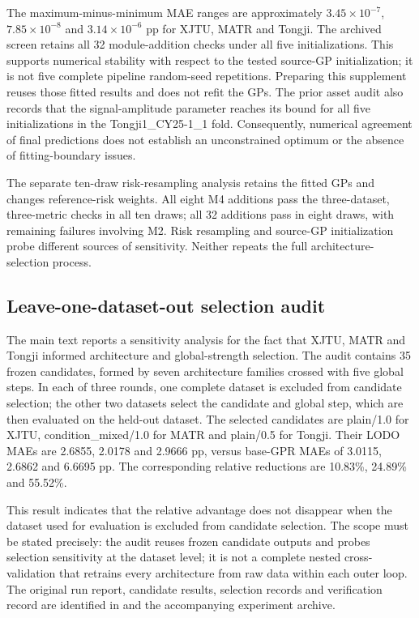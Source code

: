 \documentclass[11pt,a4paper]{article}
\begin{document}


The maximum-minus-minimum MAE ranges are approximately $3.45\times10^{-7}$, $7.85\times10^{-8}$ and $3.14\times10^{-6}$ pp for XJTU, MATR and Tongji. The archived screen retains all 32 module-addition checks under all five initializations. This supports numerical stability with respect to the tested source-GP initialization; it is not five complete pipeline random-seed repetitions. Preparing this supplement reuses those fitted results and does not refit the GPs. The prior asset audit also records that the signal-amplitude parameter reaches its bound for all five initializations in the Tongji1\_CY25-1\_1 fold. Consequently, numerical agreement of final predictions does not establish an unconstrained optimum or the absence of fitting-boundary issues.

The separate ten-draw risk-resampling analysis retains the fitted GPs and changes reference-risk weights. All eight M4 additions pass the three-dataset, three-metric checks in all ten draws; all 32 additions pass in eight draws, with remaining failures involving M2. Risk resampling and source-GP initialization probe different sources of sensitivity. Neither repeats the full architecture-selection process.

\subsection{Leave-one-dataset-out selection audit}
The main text reports a sensitivity analysis for the fact that XJTU, MATR and Tongji informed architecture and global-strength selection. The audit contains 35 frozen candidates, formed by seven architecture families crossed with five global steps. In each of three rounds, one complete dataset is excluded from candidate selection; the other two datasets select the candidate and global step, which are then evaluated on the held-out dataset. The selected candidates are plain/1.0 for XJTU, condition\_mixed/1.0 for MATR and plain/0.5 for Tongji. Their LODO MAEs are 2.6855, 2.0178 and 2.9666 pp, versus base-GPR MAEs of 3.0115, 2.6862 and 6.6695 pp. The corresponding relative reductions are 10.83\%, 24.89\% and 55.52\%.



This result indicates that the relative advantage does not disappear when the dataset used for evaluation is excluded from candidate selection. The scope must be stated precisely: the audit reuses frozen candidate outputs and probes selection sensitivity at the dataset level; it is not a complete nested cross-validation that retrains every architecture from raw data within each outer loop. The original run report, candidate results, selection records and verification record are identified in  and the accompanying experiment archive.
\end{document}

